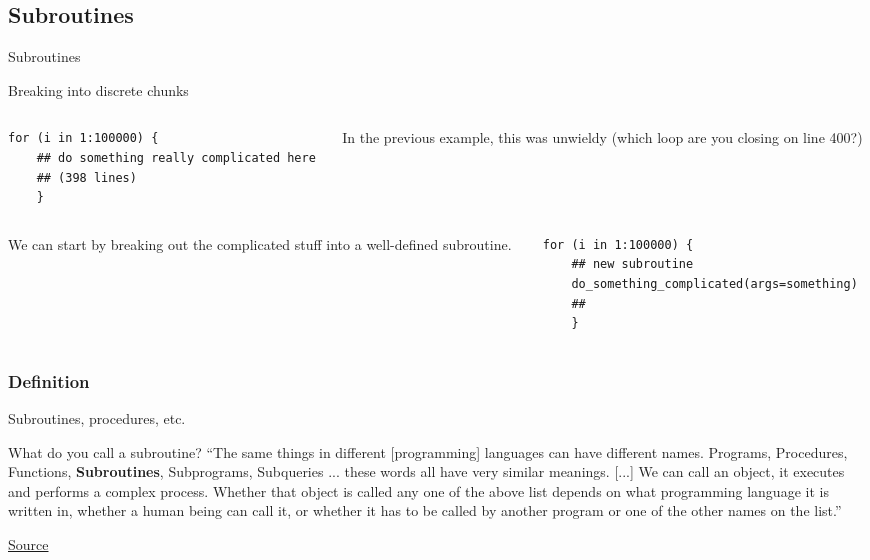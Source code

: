 \documentclass[xcolor=table,compress]{beamer}
\begin{document}
\subsection{Subroutines}
\begin{frame}[fragile]{Subroutines}
\begin{block}{Breaking into discrete chunks}
\begin{columns}
\begin{column}{.48\textwidth}
\lstset{language=R, basicstyle=\tiny}
\begin{lstlisting}
for (i in 1:100000) {
	## do something really complicated here
	## (398 lines)
	}
\end{lstlisting}

\end{column}\hfill
\pause
\begin{column}{.48\textwidth}
In the previous example, this was unwieldy (which loop are you closing on line 400?)
\end{column}
\end{columns}
\pause
\begin{columns}[b]
\begin{column}{.48\textwidth}
We can start by breaking out the complicated stuff into a well-defined subroutine.
\end{column}
\pause
\hfill
\begin{column}{.48\textwidth}
\lstset{language=R, basicstyle=\tiny}
\begin{lstlisting}
for (i in 1:100000) {
	## new subroutine
	do_something_complicated(args=something)
	##
	}
\end{lstlisting}
\end{column}
\end{columns}
\end{block}
\end{frame}


\subsubsection{Definition}
\begin{frame}{Subroutines, procedures, etc.}
\begin{block}{What do you call a subroutine?}
``The same things in different [programming] languages can have different names. Programs, Procedures, Functions, \textbf{Subroutines}, Subprograms, Subqueries ... these words all have very similar meanings. [...]
We can call an object, it executes and performs a complex process. Whether that object is called any one of the above list depends on what programming language it is written in, whether a human being can call it, or whether it has to be called by another program or one of the other names on the list.''
\end{block}
{\tiny \href{http://en.wikibooks.org/wiki/Computer_Programming/Procedures_and_functions}{Source}}
\end{frame}
\end{document}
